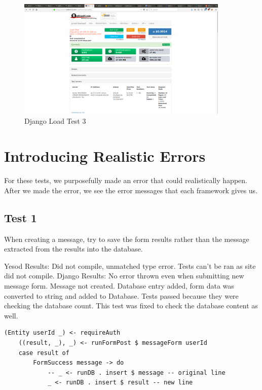 \begin{figure}[H]
	\centering
	\includegraphics[width=0.9\textwidth]{final_report/pics/djangoLoadTest3.png}
	\caption{Django Load Test 3}
	\label{fig:djangoLoadTest3}
\end{figure}

\section{Introducing Realistic Errors}

For these tests, we purposefully made an error that could realistically happen.
After we made the error, we see the error messages that each framework gives us.

\subsection{Test 1}
When creating a message, try to save the form results rather than
the message extracted from the results into the database.

Yesod Results: Did not compile, unmatched type error. Tests can't be ran
as site did not compile.
Django Results: No error thrown even when submitting new message form.
Message not created. Database entry added, form data was converted to
string and added to Database. Tests passed because they were checking
the database count. This test was fixed to check the database content
as well.

\begin{lstlisting}[caption={Yesod Code Change},label={code:yesodTest1LC}]
	(Entity userId _) <- requireAuth
	((result, _), _) <- runFormPost $ messageForm userId
	case result of
		FormSuccess message -> do
			-- _ <- runDB . insert $ message -- original line 
			_ <- runDB . insert $ result -- new line 
\end{lstlisting}

